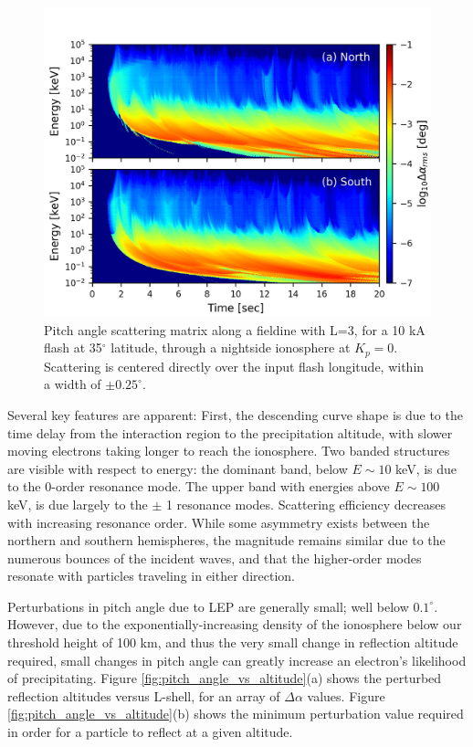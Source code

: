 \begin{figure}[h]
\begin{center}
\includegraphics{figures/dA_E-t_spectra.png}
\caption[Pitch angle scattering matrix for a flash at 35$^\circ$ latitude and L=3]{Pitch angle scattering matrix along a fieldine with L=3, for a 10 kA flash at 35$^\circ$ latitude, through a nightside ionosphere at $K_p=0$. Scattering is centered directly over the input flash longitude, within a width of $\pm0.25^\circ.$}
\label{fig:dA_spectra}
\end{center}
\end{figure}

Several key features are apparent: First, the descending curve shape is due to the time delay from the interaction region to the precipitation altitude, with slower moving electrons taking longer to reach the ionosphere. Two banded structures are visible with respect to energy: the dominant band, below $E \sim 10$ keV, is due to the 0-order resonance mode. The upper band with energies above $E  \sim 100$ keV, is due largely to the $\pm$ 1 resonance modes. Scattering efficiency decreases with increasing resonance order. While some asymmetry exists between the northern and southern hemispheres, the magnitude remains similar due to the numerous bounces of the incident waves, and that the higher-order modes resonate with particles traveling in either direction.

Perturbations in pitch angle due to LEP are generally small; well below $0.1^\circ$. However, due to the exponentially-increasing density of the ionosphere below our threshold height of 100 km, and thus the very small change in reflection altitude required, small changes in pitch angle can greatly increase an electron's likelihood of precipitating. Figure \ref{fig:pitch_angle_vs_altitude}(a) shows the perturbed reflection altitudes versus L-shell, for an array of $\Delta \alpha$ values. Figure \ref{fig:pitch_angle_vs_altitude}(b) shows the minimum perturbation value required in order for a particle to reflect at a given altitude.

